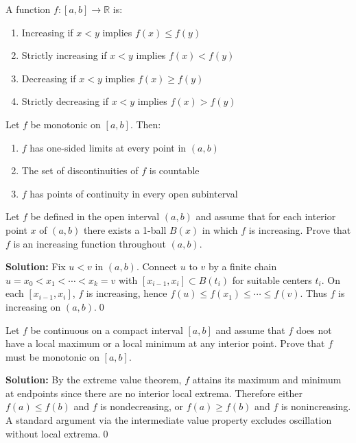 \begin{definition}
A function $f: [a,b] \to \mathbb{R}$ is:
\begin{enumerate}
\item Increasing if $x < y$ implies $f(x) \leq f(y)$
\item Strictly increasing if $x < y$ implies $f(x) < f(y)$
\item Decreasing if $x < y$ implies $f(x) \geq f(y)$
\item Strictly decreasing if $x < y$ implies $f(x) > f(y)$
\end{enumerate}
\end{definition}

\begin{theorem}
Let $f$ be monotonic on $[a,b]$. Then:
\begin{enumerate}
\item $f$ has one-sided limits at every point in $(a,b)$
\item The set of discontinuities of $f$ is countable
\item $f$ has points of continuity in every open subinterval
\end{enumerate}
\end{theorem}



\begin{problembox}
Let $f$ be defined in the open interval $(a, b)$ and assume that for each interior point $x$ of $(a, b)$ there exists a 1-ball $B(x)$ in which $f$ is increasing. Prove that $f$ is an increasing function throughout $(a, b)$.
\end{problembox}

\noindent\textbf{Solution:}
Fix $u<v$ in $(a,b)$. Connect $u$ to $v$ by a finite chain $u=x_0<x_1<\cdots<x_k=v$ with $[x_{i-1},x_i]\subset B(t_i)$ for suitable centers $t_i$. On each $[x_{i-1},x_i]$, $f$ is increasing, hence $f(u)\le f(x_1)\le\cdots\le f(v)$. Thus $f$ is increasing on $(a,b)$.\qed



\begin{problembox}
Let $f$ be continuous on a compact interval $[a, b]$ and assume that $f$ does not have a local maximum or a local minimum at any interior point. Prove that $f$ must be monotonic on $[a, b]$.
\end{problembox}

\noindent\textbf{Solution:}
By the extreme value theorem, $f$ attains its maximum and minimum at endpoints since there are no interior local extrema. Therefore either $f(a)\le f(b)$ and $f$ is nondecreasing, or $f(a)\ge f(b)$ and $f$ is nonincreasing. A standard argument via the intermediate value property excludes oscillation without local extrema.\qed



